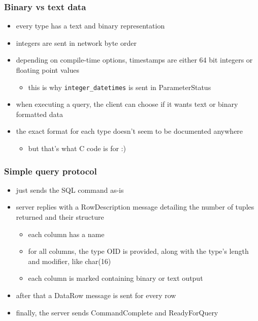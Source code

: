 \documentclass{beamer}
\begin{document}
\begin{frame}
  \frametitle{Binary vs text data}

  \begin{itemize}
  \item every type has a text and binary representation
  \item integers are sent in network byte order
  \item depending on compile-time options, timestamps are either 64 bit
    integers or floating point values
    \begin{itemize}
    \item this is why \texttt{integer\_datetimes} is sent in ParameterStatus
    \end{itemize}
  \item when executing a query, the client can choose if it wants text or
    binary formatted data
  \item the exact format for each type doesn't seem to be documented anywhere
    \begin{itemize}
    \item but that's what C code is for :)
    \end{itemize}
  \end{itemize}
\end{frame}

\begin{frame}
  \frametitle{Simple query protocol}

  \begin{itemize}
  \item just sends the SQL command as-is
  \item server replies with a RowDescription message detailing the number of
    tuples returned and their structure
    \begin{itemize}
    \item each column has a name
    \item for all columns, the type OID is provided, along with the type's
      length and modifier, like char(16)
    \item each column is marked containing binary or text output
    \end{itemize}
  \item after that a DataRow message is sent for every row
  \item finally, the server sends CommandComplete and ReadyForQuery
  \end{itemize}
\end{frame}
\end{document}
